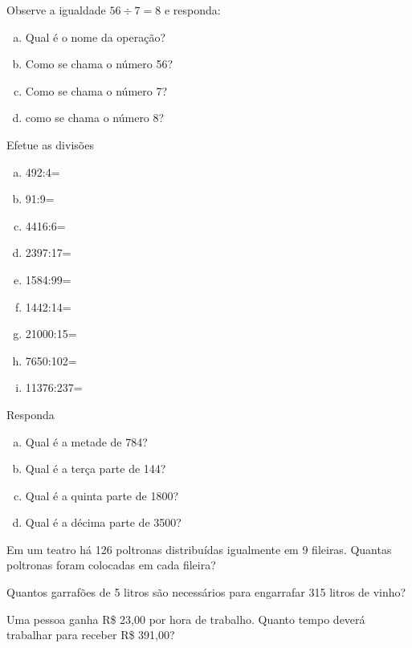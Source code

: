 \item Observe a igualdade $56\div 7=8$ e responda:
\begin{multicols}{2}
\begin{enumerate}[a)]
	\item Qual é o nome da operação?
	\item Como se chama o número 56?
	\item Como se chama o número 7?
	\item como se chama o número 8?
\end{enumerate}
\end{multicols}

\item Efetue as divisões
\begin{multicols}{3}
\begin{enumerate}[a)]
	\item 492:4= 
	\item 91:9=
	\item 4416:6=
	\item 2397:17=
	\item 1584:99=
	\item 1442:14=
	\item 21000:15=
	\item 7650:102=
	\item 11376:237=
\end{enumerate}
\end{multicols}

\item Responda
\begin{multicols}{2}
\begin{enumerate}[a)]
	\item Qual é a metade de 784?
	\item Qual é a terça parte de 144?
	\item Qual é a quinta parte de 1800?
	\item Qual é a décima parte de 3500?
\end{enumerate}
\end{multicols}

\item Em um teatro há 126 poltronas distribuídas igualmente em 9 fileiras. Quantas poltronas foram colocadas em cada fileira?

\item Quantos garrafões de 5 litros são necessários para engarrafar 315 litros de vinho?

\item Uma pessoa ganha R\$ 23,00 por hora de trabalho. Quanto tempo deverá trabalhar para receber R\$ 391,00?

